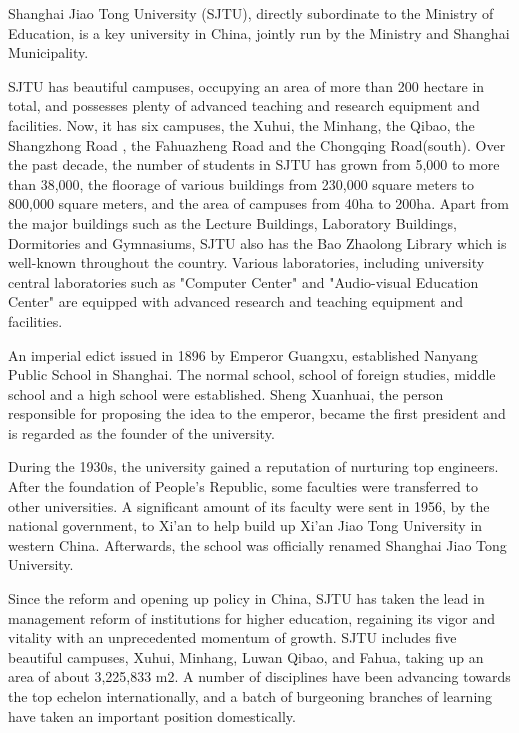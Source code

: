 

\begin{bigabstract}

  Shanghai Jiao Tong University (SJTU), directly subordinate to the Ministry of Education, is a key university in China, jointly run by the Ministry and Shanghai Municipality.

  SJTU has beautiful campuses, occupying an area of more than 200 hectare in total, and possesses plenty of advanced teaching and research equipment and facilities. Now, it has six campuses, the Xuhui, the Minhang, the Qibao, the Shangzhong Road , the Fahuazheng Road and the Chongqing Road(south). Over the past decade, the number of students in SJTU has grown from 5,000 to more than 38,000, the floorage of various buildings from 230,000 square meters to 800,000 square meters, and the area of campuses from 40ha to 200ha. Apart from the major buildings such as the Lecture Buildings, Laboratory Buildings, Dormitories and Gymnasiums, SJTU also has the Bao Zhaolong Library which is well-known throughout the country. Various laboratories, including university central laboratories such as "Computer Center" and "Audio-visual Education Center" are equipped with advanced research and teaching equipment and facilities.

An imperial edict issued in 1896 by Emperor Guangxu, established Nanyang Public School in Shanghai. The normal school, school of foreign studies, middle school and a high school were established. Sheng Xuanhuai, the person responsible for proposing the idea to the emperor, became the first president and is regarded as the founder of the university.

During the 1930s, the university gained a reputation of nurturing top engineers. After the foundation of People's Republic, some faculties were transferred to other universities. A significant amount of its faculty were sent in 1956, by the national government, to Xi'an to help build up Xi'an Jiao Tong University in western China. Afterwards, the school was officially renamed Shanghai Jiao Tong University.

Since the reform and opening up policy in China, SJTU has taken the lead in management reform of institutions for higher education, regaining its vigor and vitality with an unprecedented momentum of growth. SJTU includes five beautiful campuses, Xuhui, Minhang, Luwan Qibao, and Fahua, taking up an area of about 3,225,833 m2. A number of disciplines have been advancing towards the top echelon internationally, and a batch of burgeoning branches of learning have taken an important position domestically.


\end{bigabstract}
